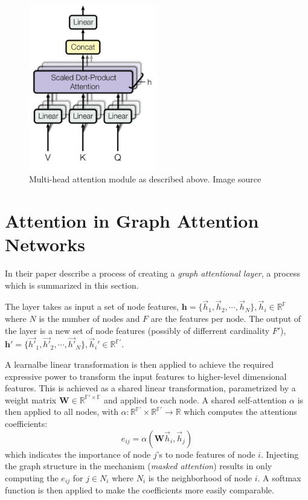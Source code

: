 \begin{figure}[H]
  \centering
  \includegraphics[width=0.5\textwidth]{Figures/appendix/multihead.png}
  \caption{Multi-head attention module as described above. Image source \cite{article:attention}}
  \label{fig:multihead}
\end{figure}

\section{Attention in Graph Attention Networks}\label{sec:attentionGAT}

In their paper \citet{velickovic2017graph} describe a process
of creating a \textit{graph attentional layer}, a process which
is summarized in this section.

The layer takes as input a set of node features, $\bm{h} =
\{\vec{h}_1, \vec{h}_2, \cdots, \vec{h}_N\}, \vec{h}_i \in \mathbb{R^F}$
where $N$ is the number of nodes and $F$ are the features per node.
The output of the layer is a new set of node features (possibly
of differrent cardinality $F'$), $\bm{h'} =
\{\vec{h'}_1, \vec{h'}_2, \cdots, \vec{h'}_N\}, \vec{h}_i'\in\mathbb{R^{F'}}$.

A learnalbe linear transformation is then applied to achieve the required
expressive power to transform the input features to higher-level dimensional
features. This is achieved as a shared linear transformation, parametrized by
a weight matrix $\bm{W} \in \mathbb{R^{F'\times F}}$ and applied to each node.
A shared self-attention $\alpha$ is then applied to all nodes, with $\alpha :
\mathbb{R^{F'}} \times \mathbb{R^{F'}} \rightarrow \mathbb{R}$ which computes
the attentions coefficients:
\begin{equation}
  \label{eq:att_coeff}
  e_{ij} = \alpha (\bm{W}\vec{h}_i, \vec{h}_j)
\end{equation}
which indicates the importance of node $j$'s to node features of node $i$.
Injecting the graph structure in the mechanism (\textit{masked attention})
results in only computing the $e_{ij}$ for $j\in N_i$ where $N_i$ is the neighborhood
of node $i$. A softmax function is then applied to make the coefficients more
easily comparable.

